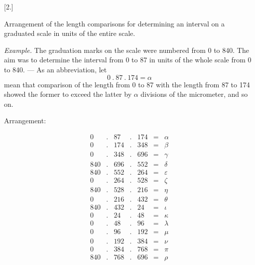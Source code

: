 \par{}
\begin{center}[2.]\end{center}
Arrangement of the length comparisons for determining an interval on a graduated scale in units of the entire scale.

\textit{Example.} The graduation marks on the scale were numbered from 0 to 840. The aim was to determine the interval from 0 to 87 in units of the whole scale from 0 to 840. — As an abbreviation, let
\[
0\ .\ 87\ .\ 174=\alpha
\]
mean that comparison of the length from 0 to 87 with the length from 87 to 174 showed the former to exceed the latter by $\alpha$ divisions of the micrometer, and so on.
\begin{center}Arrangement:\end{center}
\[
\begin{array}{rcrcrcl}
0&.&87&.&174&=&\alpha\\
0&.&174&.&348&=&\beta\\
0&.&348&.&696&=&\gamma\\
840&.&696&.&552&=&\delta\\
840&.&552&.&264&=&\varepsilon\\
0&.&264&.&528&=&\zeta\\
840&.&528&.&216&=&\eta\\
0&.&216&.&432&=&\theta\\
840&.&432&.&24&=&\iota\\
0&.&24&.&48&=&\kappa\\
0&.&48&.&96&=&\lambda\\
0&.&96&.&192&=&\mu\\
0&.&192&.&384&=&\nu\\
0&.&384&.&768&=&\pi\\
840&.&768&.&696&=&\rho
\end{array}
\]

